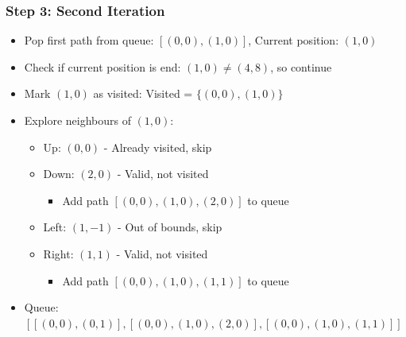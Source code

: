 \subsubsection{Step 3: Second Iteration}
\begin{itemize}
    \item Pop first path from queue: $[(0,0), (1,0)]$, Current position: $(1,0)$
    \item Check if current position is end: $(1,0) \neq (4,8)$, so continue
    \item Mark $(1,0)$ as visited: Visited = $\{(0,0), (1,0)\}$
    \item Explore neighbours of $(1,0)$:
    \begin{itemize}
        \item Up: $(0,0)$ - Already visited, skip
        \item Down: $(2,0)$ - Valid, not visited
        \begin{itemize}
            \item Add path $[(0,0), (1,0), (2,0)]$ to queue
        \end{itemize}
        \item Left: $(1,-1)$ - Out of bounds, skip
        \item Right: $(1,1)$ - Valid, not visited
        \begin{itemize}
            \item Add path $[(0,0), (1,0), (1,1)]$ to queue
        \end{itemize}
    \end{itemize}
    \item Queue: $[[(0,0), (0,1)], [(0,0), (1,0), (2,0)], [(0,0), (1,0), (1,1)]]$
\end{itemize}

